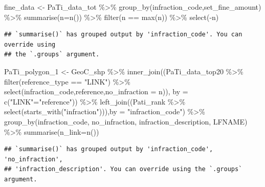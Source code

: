 \documentclass[
]{article}
\newenvironment{Shaded}{\begin{snugshade}}{\end{snugshade}}
\newcommand{\AttributeTok}[1]{\textcolor[rgb]{0.77,0.63,0.00}{#1}}
\newcommand{\FunctionTok}[1]{\textcolor[rgb]{0.00,0.00,0.00}{#1}}
\newcommand{\NormalTok}[1]{#1}
\newcommand{\OtherTok}[1]{\textcolor[rgb]{0.56,0.35,0.01}{#1}}
\newcommand{\SpecialCharTok}[1]{\textcolor[rgb]{0.00,0.00,0.00}{#1}}
\newcommand{\StringTok}[1]{\textcolor[rgb]{0.31,0.60,0.02}{#1}}
\begin{document}
\begin{Shaded}
\begin{Highlighting}[]
\NormalTok{fine\_data }\OtherTok{\textless{}{-}}\NormalTok{ PaTi\_data\_tot }\SpecialCharTok{\%\textgreater{}\%} \FunctionTok{group\_by}\NormalTok{(infraction\_code,set\_fine\_amount) }\SpecialCharTok{\%\textgreater{}\%} \FunctionTok{summarise}\NormalTok{(}\AttributeTok{n=}\FunctionTok{n}\NormalTok{()) }\SpecialCharTok{\%\textgreater{}\%} \FunctionTok{filter}\NormalTok{(n }\SpecialCharTok{==} \FunctionTok{max}\NormalTok{(n)) }\SpecialCharTok{\%\textgreater{}\%} \FunctionTok{select}\NormalTok{(}\SpecialCharTok{{-}}\NormalTok{n)}
\end{Highlighting}
\end{Shaded}

\begin{verbatim}
## `summarise()` has grouped output by 'infraction_code'. You can override using
## the `.groups` argument.
\end{verbatim}

\begin{Shaded}
\begin{Highlighting}[]
\NormalTok{PaTi\_polygon\_1 }\OtherTok{\textless{}{-}}\NormalTok{ GeoC\_shp }\SpecialCharTok{\%\textgreater{}\%} 
  \FunctionTok{inner\_join}\NormalTok{((PaTi\_data\_top20 }\SpecialCharTok{\%\textgreater{}\%}
               \FunctionTok{filter}\NormalTok{(reference\_type }\SpecialCharTok{==} \StringTok{"LINK"}\NormalTok{) }\SpecialCharTok{\%\textgreater{}\%}
               \FunctionTok{select}\NormalTok{(infraction\_code,reference,}\AttributeTok{no\_infraction =}\NormalTok{ n)),}
             \AttributeTok{by =} \FunctionTok{c}\NormalTok{(}\StringTok{"LINK"}\OtherTok{=}\StringTok{"reference"}\NormalTok{)) }\SpecialCharTok{\%\textgreater{}\%} 
  \FunctionTok{left\_join}\NormalTok{((Pati\_rank }\SpecialCharTok{\%\textgreater{}\%} \FunctionTok{select}\NormalTok{(}\FunctionTok{starts\_with}\NormalTok{(}\StringTok{"infraction"}\NormalTok{))),}\AttributeTok{by =} \StringTok{"infraction\_code"}\NormalTok{) }\SpecialCharTok{\%\textgreater{}\%} 
  \FunctionTok{group\_by}\NormalTok{(infraction\_code, no\_infraction, infraction\_description, LFNAME) }\SpecialCharTok{\%\textgreater{}\%} 
  \FunctionTok{summarise}\NormalTok{(}\AttributeTok{n\_link=}\FunctionTok{n}\NormalTok{())}
\end{Highlighting}
\end{Shaded}

\begin{verbatim}
## `summarise()` has grouped output by 'infraction_code', 'no_infraction',
## 'infraction_description'. You can override using the `.groups` argument.
\end{verbatim}
\end{document}

